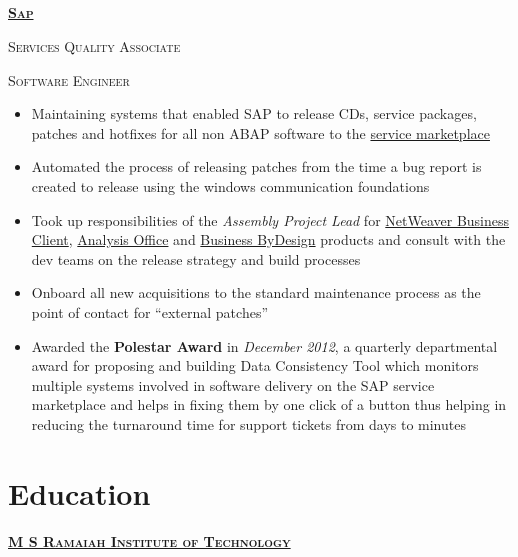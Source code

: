 \documentclass{article}
\begin{document}
\subsection[Sap]{}
{\raggedright{\textsc{\textbf{\href{https://www.sap.com/index.html}{Sap}}}}} \hfill {}

{\raggedright{\textsc{Services Quality Associate}}} \hfill {}

{\raggedright{\textsc{Software Engineer}}} \hfill {}

\begin{itemize}[noitemsep,nolistsep]
\item Maintaining systems that enabled SAP to release CDs, service packages, patches and hotfixes for all non ABAP software to the \href{https://support.sap.com/en/index.html}{service marketplace}
\item Automated the process of releasing patches from the time a bug report is created to release using the windows communication foundations
\item Took up responsibilities of the \textit{Assembly Project Lead} for \href{https://help.sap.com/docs/SAP_NETWEAVER_731_BW_ABAP/9737050ef01843f19572591b42128f1b/4c5b13bf97817513e10000000a42189b.html?version=7.31.23}{NetWeaver Business Client}, \href{https://help.sap.com/docs/SAP_BUSINESSOBJECTS_ANALYSIS_OFFICE?version=2.8.0.0}{Analysis Office} and \href{https://www.sap.com/products/business-bydesign.html}{Business ByDesign} products and consult with the dev teams on the release strategy and build processes
\item Onboard all new acquisitions to the standard maintenance process as the point of contact for “external patches”
\item Awarded the \textbf{Polestar Award} in \textit{December 2012}, a quarterly departmental award for proposing and building Data Consistency Tool which monitors multiple systems involved in software delivery on the SAP service marketplace and helps in fixing them by one click of a button thus helping in reducing the turnaround time for support tickets from days to minutes
\end{itemize}

\section{Education}
{\raggedright{\textsc{\textbf{\href{http://www.msrit.edu}{M S Ramaiah Institute of Technology}}}}} \hfill {}
\end{document}
